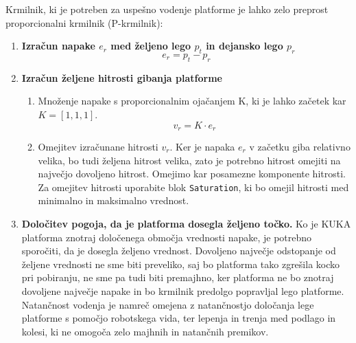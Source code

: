 Krmilnik, ki je potreben za uspešno vodenje platforme je lahko zelo preprost proporcionalni krmilnik (P-krmilnik):
\begin{enumerate}
\item \textbf{Izračun napake $e_r$ med željeno lego $p_t$ in dejansko lego $p_r$}
\begin{equation}
    e_r = p_t - p_r
\end{equation}
\item \textbf{Izračun željene hitrosti gibanja platforme}
\begin{enumerate}
\item Množenje napake s proporcionalnim ojačanjem K, ki je lahko začetek kar $K=[1,1,1]$.
\begin{equation}
    v_r = K \cdot e_r
\end{equation}
\item Omejitev izračunane hitrosti $v_r$. Ker je napaka $e_r$ v začetku giba relativno velika, bo tudi željena hitrost velika, zato je potrebno hitrost omejiti na največjo dovoljeno hitrost. Omejimo kar posamezne komponente hitrosti. Za omejitev hitrosti uporabite blok \verb|Saturation|, ki bo omejil hitrosti med minimalno in maksimalno vrednost.

%
\end{enumerate}
\item \textbf{Določitev pogoja, da je platforma dosegla željeno točko.} Ko je KUKA platforma znotraj določenega območja vrednosti napake, je potrebno sporočiti, da je dosegla željeno vrednost. Dovoljeno največje odstopanje od željene vrednosti ne sme biti preveliko, saj bo platforma tako zgrešila kocko pri pobiranju, ne sme pa tudi biti premajhno, ker platforma ne bo znotraj dovoljene največje napake in bo krmilnik predolgo popravljal lego platforme. Natančnost vodenja je namreč omejena z natančnostjo določanja lege platforme s pomočjo robotskega vida, ter lepenja in trenja med podlago in kolesi, ki ne omogoča zelo majhnih in natančnih premikov. \newline


\end{enumerate}
